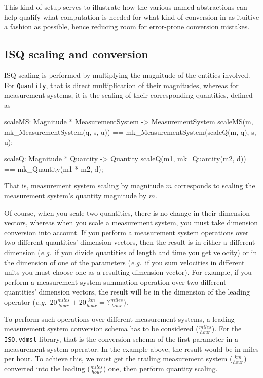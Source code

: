 \documentclass[runningheads,a4paper]{llncs}
\begin{document}
This kind of setup serves to illustrate how the various named abstractions can help qualify what computation is needed for what kind of conversion in as ituitive a fashion as possible, hence reducing room for error-prone conversion mistakes.  

\subsection*{ISQ scaling and conversion}

ISQ scaling is performed by multiplying the magnitude of the entities involved. For \texttt{Quantity}, that is direct multiplication of their magnitudes, whereas for measurement systems, it is the scaling of their corresponding quantities, defined as
%
\begin{vdmsl}[frame=none,basicstyle=\ttfamily\scriptsize]
    scaleMS: Magnitude * MeasurementSystem -> MeasurementSystem
    scaleMS(m, mk_MeasurementSystem(q, s, u)) == 
        mk_MeasurementSystem(scaleQ(m, q), s, u);

    scaleQ: Magnitude * Quantity -> Quantity
    scaleQ(m1, mk_Quantity(m2, d)) == mk_Quantity(m1 * m2, d);
\end{vdmsl} 
%
\noindent That is, measurement system scaling by magnitude \(m\) corresponds to scaling the measurement system's quantity magnitude by \(m\). 

Of course, when you scale two quantities, there is no change in their dimension vectors, whereas when you scale a measurement system, you must take dimension conversion into account. If you perform a measurement system operations over two different quantities' dimension vectors, then the result is in either a different dimension (\textit{e.g.}~if you divide quantities of length and time you get velocity) or in the dimension of one of the parameters (\textit{e.g.}~if you sum velocities in different units you must choose one as a resulting dimension vector). For example, if you perform a measurement system summation operation over two different quantities' dimension vectors, the result will be in the dimension of the leading operator (\textit{e.g.}~\(20\frac{miles}{hour} + 20\frac{km}{hour} = ?\frac{miles}{hour}\)).

To perform such operations over different measurement systems, a leading measurement system conversion schema has to be considered (\(\frac{miles}{hour}\)). For the \texttt{ISQ.vdmsl} library, that is the conversion schema of the first parameter in a measurement system operator. In the example above, the result would be in miles per hour. To achieve this, we must get the trailing measurement system (\(\frac{km}{hour}\)) converted into the leading (\(\frac{miles}{hour}\)) one, then perform quantity scaling.
\end{document}
